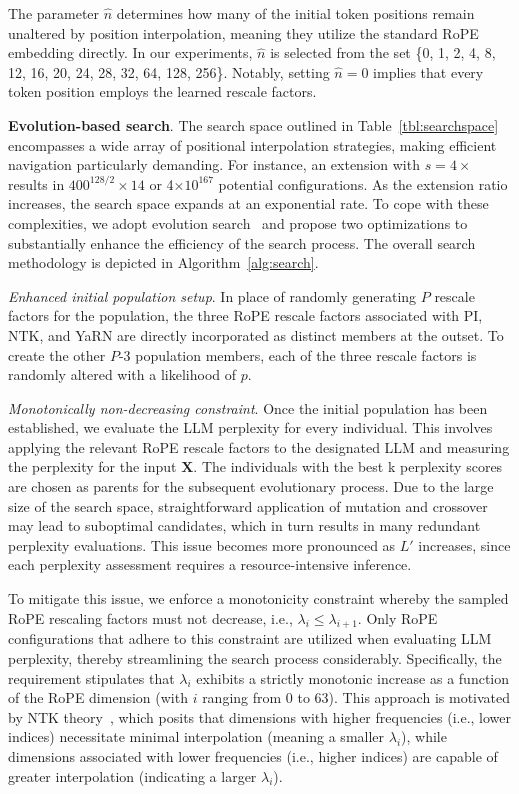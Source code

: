 The parameter $\hat{n}$ determines how many of the initial token positions remain unaltered by position interpolation, meaning they utilize the standard RoPE embedding directly. In our experiments, $\hat{n}$ is selected from the set \{0, 1, 2, 4, 8, 12, 16, 20, 24, 28, 32, 64, 128, 256\}. Notably, setting $\hat{n}=0$ implies that every token position employs the learned rescale factors.

\textbf{Evolution-based search}. The search space outlined in Table~\ref{tbl:searchspace} encompasses a wide array of positional interpolation strategies, making efficient navigation particularly demanding. For instance, an extension with $s=4\times$ results in $400^{128/2}\times14$ or 4$\times10^{167}$ potential configurations. As the extension ratio increases, the search space expands at an exponential rate. To cope with these complexities, we adopt evolution search~\cite{guo2020single} and propose two optimizations to substantially enhance the efficiency of the search process. The overall search methodology is depicted in Algorithm~\ref{alg:search}.

\textit{Enhanced initial population setup}. In place of randomly generating $P$ rescale factors for the population, the three RoPE rescale factors associated with PI, NTK, and YaRN are directly incorporated as distinct members at the outset. To create the other $P$-3 population members, each of the three rescale factors is randomly altered with a likelihood of $p$.

\textit{Monotonically non-decreasing constraint}. Once the initial population has been established, we evaluate the LLM perplexity for every individual. This involves applying the relevant RoPE rescale factors to the designated LLM and measuring the perplexity for the input $\mathbf{X}$. The individuals with the best k perplexity scores are chosen as parents for the subsequent evolutionary process. Due to the large size of the search space, straightforward application of mutation and crossover may lead to suboptimal candidates, which in turn results in many redundant perplexity evaluations. This issue becomes more pronounced as $L'$ increases, since each perplexity assessment requires a resource-intensive inference.

To mitigate this issue, we enforce a monotonicity constraint whereby the sampled RoPE rescaling factors must not decrease, i.e., $\lambda_i \leq \lambda_{i+1}$. Only RoPE configurations that adhere to this constraint are utilized when evaluating LLM perplexity, thereby streamlining the search process considerably. Specifically, the requirement stipulates that $\lambda_i$ exhibits a strictly monotonic increase as a function of the RoPE dimension (with $i$ ranging from 0 to 63). This approach is motivated by NTK theory~\cite{jacot2018neural,tancik2020fourier,ntk}, which posits that dimensions with higher frequencies (i.e., lower indices) necessitate minimal interpolation (meaning a smaller $\lambda_i$), while dimensions associated with lower frequencies (i.e., higher indices) are capable of greater interpolation (indicating a larger $\lambda_i$).

